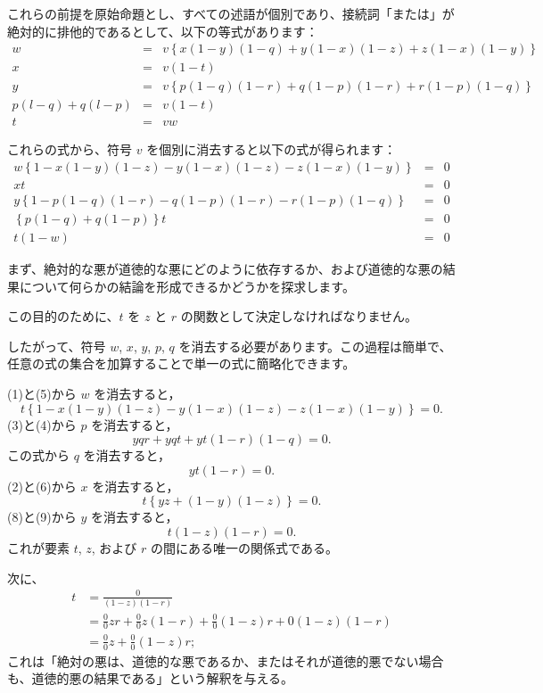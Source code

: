 \documentclass[a4paper,11pt,openany]{ltjsbook}
\begin{document}
これらの前提を原始命題とし、すべての述語が個別であり、接続詞「または」が絶対的に排他的であるとして、以下の等式があります：
\begin{eqnarray*}
 w &=& v \left\{ x(1-y)(1-q) + y(1-x)(1-z) + z(1-x)(1-y) \right\} \\
 x &=& v (1 - t) \\
 y &=& v \left\{ p (1-q)(1-r) + q (1-p)(1-r) + r(1-p)(1-q) \right\} \\
 p(l-q) + q(l-p) &=& v(1-t) \\
 t &=& vw
\end{eqnarray*}

これらの式から、符号 $v$ を個別に消去すると以下の式が得られます：
\begin{eqnarray}
 w \left\{
   1 - x(1-y)(1-z) - y(1-x)(1-z) - z(1-x)(1-y)
 \right\} &=& 0 \\
 xt &=& 0 \\
 y \left\{
   1 - p(1-q)(1-r) - q(1-p)(1-r) - r(1-p)(1-q)
 \right\} &=& 0 \\
 \left\{ p(1-q) + q(1-p) \right\}t &=& 0 \\
 t(1-w) &=& 0
\end{eqnarray}

まず、絶対的な悪が道徳的な悪にどのように依存するか、および道徳的な悪の結果について何らかの結論を形成できるかどうかを探求します。

この目的のために、$t$ を $z$ と $r$ の関数として決定しなければなりません。

したがって、符号 $w$, $x$, $y$, $p$, $q$ を消去する必要があります。この過程は簡単で、任意の式の集合を加算することで単一の式に簡略化できます。

(1)と(5)から $w$ を消去すると，
\[
t \left\{
   1 - x(1-y)(1-z) - y(1-x)(1-z) - z(1-x)(1-y)
 \right\} = 0. \tag{6}
\]
(3)と(4)から $p$ を消去すると，
\[
yqr + yqt + yt(1-r)(1-q) = 0. \tag{7}
\]
この式から $q$ を消去すると，
\[
yt(1-r) = 0. \tag{8}
\]
(2)と(6)から $x$ を消去すると，
\[
t \left\{
   yz + (1-y)(1-z)
 \right\} = 0. \tag{9}
\]
(8)と(9)から $y$ を消去すると，
\[
t(1-z)(1-r) = 0.
\]
これが要素 $t$, $z$, および $r$ の間にある唯一の関係式である。

次に、
\begin{align*}
  t &= \frac{0}{(1-z)(1-r)}   \\
    &= \frac{0}{0}zr + \frac{0}{0}z(1-r)
     + \frac{0}{0}(1-z)r + 0(1-z)(1-r)   \\
    &= \frac{0}{0}z + \frac{0}{0}(1-z)r;
\end{align*}
これは「絶対の悪は、道徳的な悪であるか、またはそれが道徳的悪でない場合も、道徳的悪の結果である」という解釈を与える。
\end{document}
